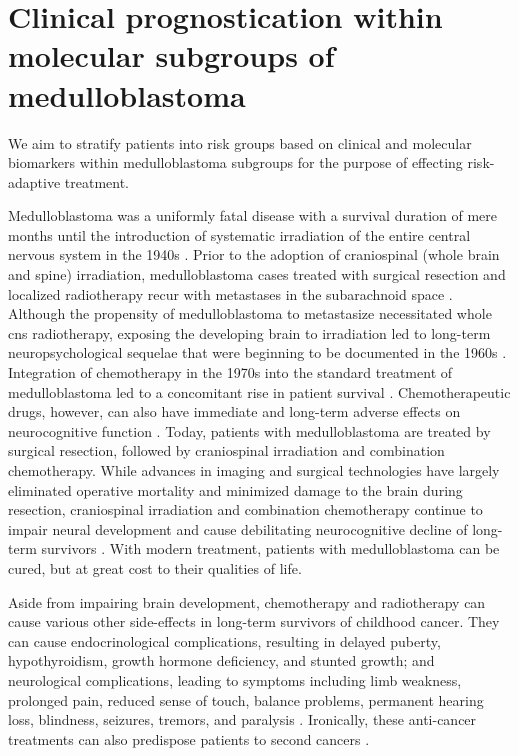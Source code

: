 \chapter{Clinical prognostication within molecular subgroups of medulloblastoma}
\label{ch:clin-prog}

\begin{objective}
We aim to stratify patients into risk groups based on clinical and molecular biomarkers within medulloblastoma subgroups for the purpose of effecting risk-adaptive treatment.
\end{objective}

Medulloblastoma was a uniformly fatal disease with a survival duration of mere months until the introduction of systematic irradiation of the entire central nervous system in the 1940s . Prior to the adoption of craniospinal (whole brain and spine) irradiation, medulloblastoma cases treated with surgical resection and localized radiotherapy recur with metastases in the subarachnoid space . Although the propensity of medulloblastoma to metastasize necessitated whole \gls{cns} radiotherapy, exposing the developing brain to irradiation led to long-term neuropsychological sequelae that were beginning to be documented in the 1960s . Integration of chemotherapy in the 1970s into the standard treatment of medulloblastoma led to a concomitant rise in patient survival . Chemotherapeutic drugs, however, can also have immediate and long-term adverse effects on neurocognitive function . Today, patients with medulloblastoma are treated by surgical resection, followed by craniospinal irradiation and combination chemotherapy. While advances in imaging and surgical technologies have largely eliminated operative mortality and minimized damage to the brain during resection, craniospinal irradiation and combination chemotherapy continue to impair neural development and cause debilitating neurocognitive decline of long-term survivors . With modern treatment, patients with medulloblastoma can be cured, but at great cost to their qualities of life.

Aside from impairing brain development, chemotherapy and radiotherapy can cause various other side-effects in long-term survivors of childhood cancer. They can cause endocrinological complications, resulting in delayed puberty, hypothyroidism, growth hormone deficiency, and stunted growth; and neurological complications, leading to symptoms including limb weakness, prolonged pain, reduced sense of touch, balance problems, permanent hearing loss, blindness, seizures, tremors, and paralysis . Ironically, these anti-cancer treatments can also predispose patients to second cancers .

